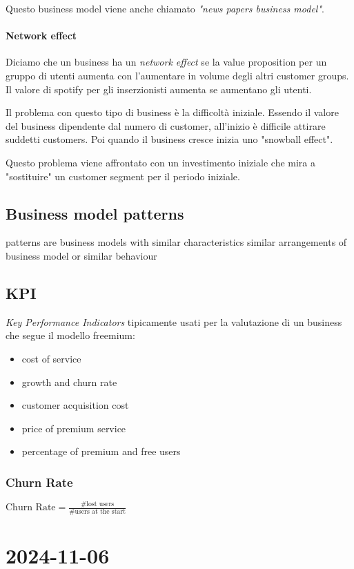 \documentclass{article}
\begin{document}
Questo business model viene anche chiamato \textit{"news papers business model"}.

\paragraph{Network effect} Diciamo che un business ha un \textit{network effect} se la value proposition per un gruppo di utenti aumenta con l'aumentare in volume degli altri customer groups. Il valore di spotify per gli inserzionisti aumenta se aumentano gli utenti.

Il problema con questo tipo di business è la difficoltà iniziale. Essendo il valore del business dipendente dal numero di customer, all'inizio è difficile attirare suddetti customers. Poi quando il business cresce inizia uno "snowball effect".

Questo problema viene affrontato con un investimento iniziale che mira a "sostituire" un customer segment per il periodo iniziale.

\subsection{Business model patterns}
patterns are business models with similar characteristics similar arrangements of business model or similar behaviour

\subsection{KPI}
\textit{Key Performance Indicators} tipicamente usati per la valutazione di un business che segue il modello freemium:
\begin{itemize}
    \item cost of service
    \item growth and churn rate
    \item customer acquisition cost
    \item price of premium service
    \item percentage of premium and free users
\end{itemize}

\subsubsection{Churn Rate}
$\text{Churn Rate} = \frac{\#\text{lost users}}{\#\text{users at the start}}$

\section{2024-11-06}
\end{document}
